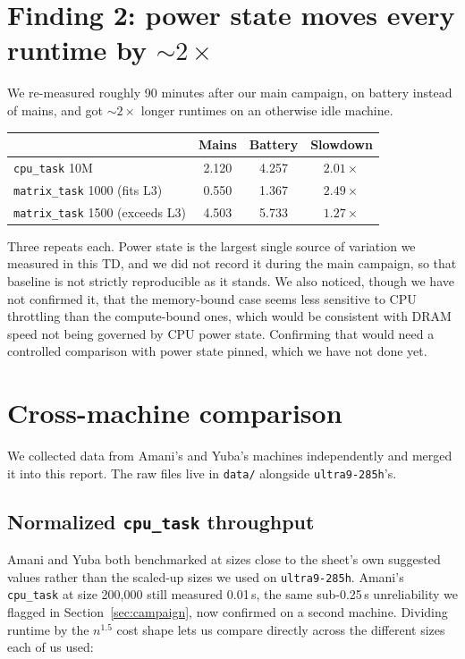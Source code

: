\documentclass[11pt]{article}
\newcommand{\code}[1]{\texttt{#1}}
\begin{document}
\section{Finding 2: power state moves every runtime by $\sim\!2\times$}
\label{sec:finding2}
We re-measured roughly 90 minutes after our main campaign, on battery instead of mains, and got
$\sim\!2\times$ longer runtimes on an otherwise idle machine.

\begin{center}
\begin{tabular}{lccc}
\toprule
& Mains & Battery & Slowdown \\
\midrule
\code{cpu\_task} 10M                    & 2.120 & 4.257 & $2.01\times$ \\
\code{matrix\_task} 1000 (fits L3)      & 0.550 & 1.367 & $2.49\times$ \\
\code{matrix\_task} 1500 (exceeds L3)   & 4.503 & 5.733 & $1.27\times$ \\
\bottomrule
\end{tabular}
\end{center}

Three repeats each. Power state is the largest single source of variation we measured in this TD,
and we did not record it during the main campaign, so that baseline is not strictly reproducible
as it stands. We also noticed, though we have not confirmed it, that the memory-bound case seems
less sensitive to CPU throttling than the compute-bound ones, which would be consistent with DRAM
speed not being governed by CPU power state. Confirming that would need a controlled comparison
with power state pinned, which we have not done yet.

\section{Cross-machine comparison}
\label{sec:cross-machine}
We collected data from Amani's and Yuba's machines independently and merged it into this report.
The raw files live in \code{data/} alongside \code{ultra9-285h}'s.

\subsection{Normalized \code{cpu\_task} throughput}
Amani and Yuba both benchmarked at sizes close to the sheet's own suggested values rather than the
scaled-up sizes we used on \code{ultra9-285h}. Amani's \code{cpu\_task} at size 200{,}000 still
measured 0.01\,s, the same sub-0.25\,s unreliability we flagged in Section~\ref{sec:campaign}, now
confirmed on a second machine. Dividing runtime by the $n^{1.5}$ cost shape lets us compare
directly across the different sizes each of us used:
\end{document}
